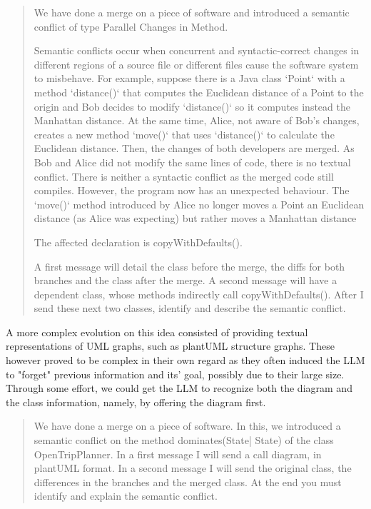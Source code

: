 \begin{quote}
We have done a merge on a piece of software and introduced a semantic conflict of type Parallel Changes in Method.

Semantic conflicts occur when concurrent and syntactic-correct changes in different regions of a source file or different files cause the software system to misbehave. For example, suppose there is a Java class `Point` with a method `distance()` that computes the Euclidean distance of a Point to the origin and Bob decides to modify `distance()` so it computes instead the Manhattan distance. At the same time, Alice, not aware of Bob's changes, creates a new method `move()` that uses `distance()` to calculate the Euclidean distance. Then, the changes of both developers are merged. As Bob and Alice did not modify the same lines of code, there is no textual conflict. There is neither a syntactic conflict as the merged code still compiles. However, the program now has an unexpected behaviour. The `move()` method introduced by Alice no longer moves a Point an Euclidean distance (as Alice was expecting) but rather moves a Manhattan distance

The affected declaration is copyWithDefaults().

A first message will detail the class before the merge, the diffs for both branches and the class after the merge. A second message will have a dependent class, whose methods indirectly call copyWithDefaults(). After I send these next two classes, identify and describe the semantic conflict.    
\end{quote}

A more complex evolution on this idea consisted of providing textual representations of UML graphs, such as plantUML structure graphs. These however proved to be complex in their own regard as they often induced the LLM to "forget" previous information and its' goal, possibly due to their large size. Through some effort, we could get the LLM to recognize both the diagram and the class information, namely, by offering the diagram first.

\begin{quote}
We have done a merge on a piece of software. In this, we introduced a semantic conflict on the method dominates(State| State) of the class OpenTripPlanner. In a first message I will send a call diagram, in plantUML format. In a second message I will send the original class, the differences in the branches and the merged class.  At the end you must identify and explain the semantic conflict.
\end{quote}

